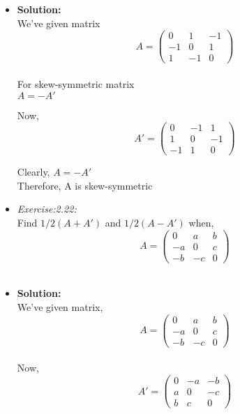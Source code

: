 \documentclass{article}
\begin{document}
\begin{itemize}
 \item{\textbf{Solution:}}\\
 
 We've given matrix
 \[
 A=
 \begin{pmatrix}
 0 & 1 & -1\\
 -1 & 0 & 1\\
 1 & -1 & 0
 \end{pmatrix}
 \]
\\

For skew-symmetric matrix\\
$A=-A'$

Now,\\

\[
 A'=
 \begin{pmatrix}
 0 & -1 & 1\\
 1 & 0 & -1\\
 -1 & 1 & 0
 \end{pmatrix}
 \]
 
 Clearly, $A=-A'$\\
 
Therefore, A is skew-symmetric\\
\newpage 
 
 \item{\textit{Exercise:2.22:}}\\
 
Find  $1/2(A+A')$ and $1/2(A-A')$ when,\\
 
 \[
 A=
 \begin{pmatrix}
 0 & a & b\\
 -a & 0 & c\\
 -b & -c & 0
 \end{pmatrix}
 \]
 \\
 \item{\textbf{Solution:}}\\

We've given matrix,\\

 
 \[
 A=
 \begin{pmatrix}
 0 & a & b\\
 -a & 0 & c\\
 -b & -c & 0
 \end{pmatrix}
 \]\\
 
 Now,\\
 
  \[
 A'=
 \begin{pmatrix}
 0 & -a & -b\\
 a & 0 & -c\\
 b & c & 0
 \end{pmatrix}
 \]
 \\


\end{itemize}
\end{document}
